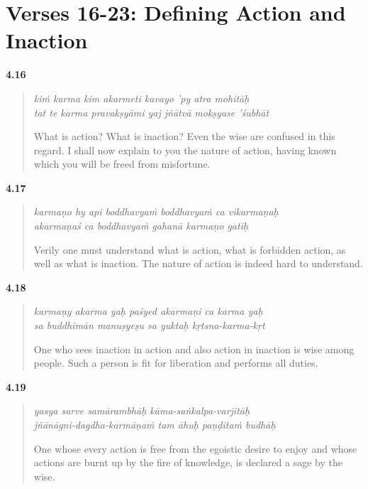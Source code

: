 \section{Verses 16-23: Defining Action and Inaction}\label{sec-verses-16-23-defining-action-and-inaction}

\par\noindent\textbf{4.16}\par
\begin{verse}
\textit{kiṁ karma kim akarmeti kavayo ’py atra mohitāḥ} \\
\textit{tat te karma pravakṣyāmi yaj jñātvā mokṣyase ’śubhāt}

\noindent What is action? What is inaction? Even the wise are confused in this regard. I shall now explain to you the nature of action, having known which you will be freed from misfortune.
\end{verse}
\par



\par\noindent\textbf{4.17}\par
\begin{verse}
\textit{karmaṇo hy api boddhavyaṁ boddhavyaṁ ca vikarmaṇaḥ} \\
\textit{akarmaṇaś ca boddhavyaṁ gahanā karmaṇo gatiḥ}

\noindent Verily one must understand what is action, what is forbidden action, as well as what is inaction. The nature of action is indeed hard to understand.
\end{verse}
\par



\par\noindent\textbf{4.18}\par
\begin{verse}
\textit{karmaṇy akarma yaḥ paśyed akarmaṇi ca karma yaḥ} \\
\textit{sa buddhimān manuṣyeṣu sa yuktaḥ kṛtsna-karma-kṛt}

\noindent One who sees inaction in action and also action in inaction is wise among people. Such a person is fit for liberation and performs all duties.
\end{verse}
\par



\par\noindent\textbf{4.19}\par
\begin{verse}
\textit{yasya sarve samārambhāḥ kāma-saṅkalpa-varjitāḥ} \\
\textit{jñānāgni-dagdha-karmāṇaṁ tam āhuḥ paṇḍitaṁ budhāḥ}

\noindent One whose every action is free from the egoistic desire to enjoy and whose actions are burnt up by the fire of knowledge, is declared a sage by the wise.
\end{verse}
\par



